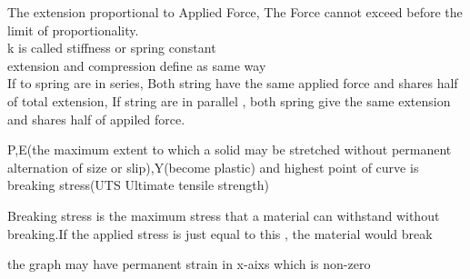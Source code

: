 \documentclass[a4paper]{article}
\begin{document}
\begin{law}
The extension proportional to Applied Force, The Force cannot exceed before the limit of proportionality.\\
k is called stiffness or spring constant\\

extension and compression define as same way\\

If to spring are in series, Both string have the same applied force and shares half of total extension, If string are in parallel , both spring give the same extension and shares half of appiled force. 
\end{law}

\begin{defi}
P,E(the maximum extent to which a solid may be stretched without permanent alternation of size or slip),Y(become plastic)
and highest point of curve is breaking stress(UTS Ultimate tensile strength)

Breaking stress is the maximum stress that a material can withstand without breaking.If the applied stress is just equal to this , the material would break

the graph may have permanent strain in x-aixs which is non-zero
\end{defi}
\end{document}

